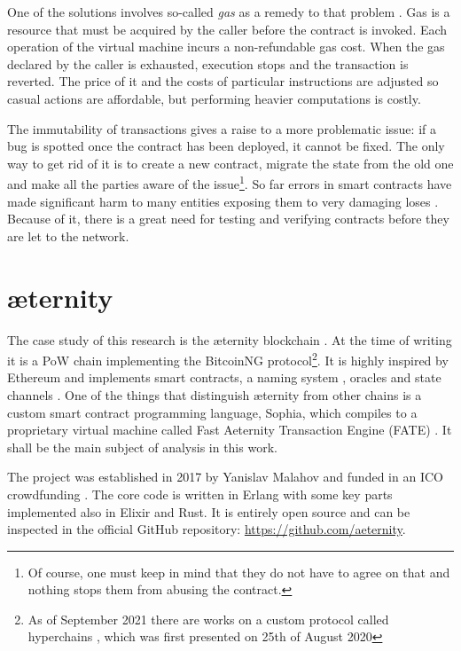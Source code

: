 One of the solutions involves so-called \emph{gas} as a remedy to that
problem \cite{wood2014ethereum}. Gas is a resource that must be acquired by the
caller before the contract is invoked. Each operation of the virtual machine
incurs a non-refundable gas cost. When the gas declared by the caller is
exhausted, execution stops and the transaction is reverted. The price of it and
the costs of particular instructions are adjusted so casual actions are
affordable, but performing heavier computations is costly.

The immutability of transactions gives a raise to a more problematic issue: if a
bug is spotted once the contract has been deployed, it cannot be fixed. The only
way to get rid of it is to create a new contract, migrate the state from the old
one and make all the parties aware of the issue\footnote{Of course, one must
  keep in mind that they do not have to agree on that and nothing stops them
  from abusing the contract.}. So far errors in smart contracts have made
significant harm to many entities exposing them to very damaging
loses \cite{peterjoost2018, olha.hlebiv2018, bishwascgupta2019, mattsuiche2017,
  christianreitwiessner2016}. Because of it, there is a great need for testing
and verifying contracts before they are let to the network.

\section{{\ae}ternity}

The case study of this research is the {\ae}ternity blockchain \cite{aeternity}.
At the time of writing it is a PoW chain implementing the BitcoinNG
\cite{Gencer:2017:SBT} protocol\footnote{As of September 2021 there are works on
  a custom protocol called hyperchains \cite{hyperchains}, which was first
  presented on 25th of August 2020}. It is highly inspired by Ethereum and
implements smart contracts, a naming system \cite{aens,
  brantlymillegannickjohnson2021}, oracles \cite{oracles} and state channels
\cite{state_channels, state_channels_eth}. One of the things that distinguish
{\ae}ternity from other chains is a custom smart contract programming language,
Sophia, which compiles to a proprietary virtual machine called Fast Aeternity
Transaction Engine (FATE) \cite{fate}. It shall be the main subject of analysis
in this work.

The project was established in 2017 by Yanislav Malahov and funded in an
ICO crowdfunding \cite{crunchbase2017}. The core code is written in Erlang with
some key parts implemented also in Elixir and Rust. It is entirely open source
and can be inspected in the official GitHub repository:
\url{https://github.com/aeternity}.
